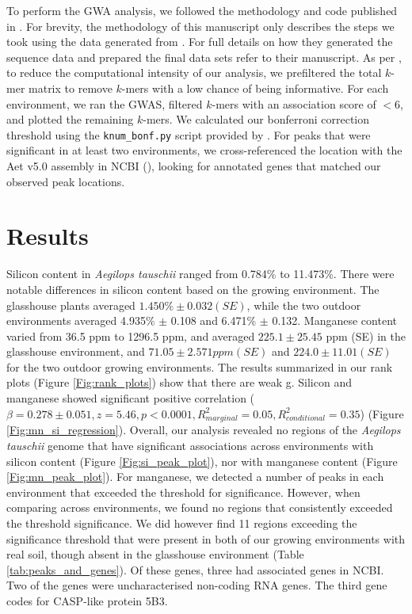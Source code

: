 \documentclass[12pt, letterpaper, ]{report}
\begin{document}
To perform the GWA analysis, we followed the methodology and code published in \textcite{gaurav_population_2022}. For brevity, the methodology of this manuscript only describes the steps we took using the data generated from \textcite{gaurav_population_2022}. For full details on how they generated the sequence data and prepared the final data sets refer to their manuscript. As per \textcite{gaurav_population_2022}, to reduce the computational intensity of our analysis, we prefiltered the total $k$-mer matrix to remove $k$-mers with a low chance of being informative. For each environment, we ran the GWAS, filtered $k$-mers with an association score of $<6$, and plotted the remaining $k$-mers. We calculated our bonferroni correction threshold using the \verb|knum_bonf.py| script provided by \textcite{gaurav_population_2022}. For peaks that were significant in at least two environments, we cross-referenced the location with the Aet v5.0 assembly in NCBI (\cite{wang_aegilops_2021}), looking for annotated genes that matched our observed peak locations. 

\section{Results}

 Silicon content in \textit{Aegilops tauschii} ranged from 0.784\% to 11.473\%. There were notable differences in silicon content based on the growing environment. The glasshouse plants averaged $1.450\% \pm 0.032 (SE)$, while the two outdoor environments averaged 4.935\% $\pm$ 0.108 and 6.471\% $\pm$ 0.132. Manganese content varied from 36.5 ppm to 1296.5 ppm, and averaged $225.1 \pm 25.45$ ppm (SE) in the glasshouse environment, and $ 71.05 \pm 2.571 ppm (SE)$ and $ 224.0 \pm 11.01 (SE)$ for the two outdoor growing environments. The results summarized in our rank plots (Figure \ref{Fig:rank_plots}) show that there are weak g. Silicon and manganese showed significant positive correlation ($\beta = 0.278 \pm 0.051, z = 5.46, p<0.0001, R^2_{marginal} = 0.05, R^2_{conditional} = 0.35 $) (Figure \ref{Fig:mn_si_regression}). Overall, our analysis revealed no regions of the \textit{Aegilops tauschii} genome that have significant associations across environments with silicon content (Figure \ref{Fig:si_peak_plot}), nor with manganese content (Figure \ref{Fig:mn_peak_plot}). For manganese, we detected a number of peaks in each environment that exceeded the threshold for significance. However, when comparing across environments, we found no regions that consistently exceeded the threshold significance. We did however find 11 regions exceeding the significance threshold that were present in both of our growing environments with real soil, though absent in the glasshouse environment (Table \ref{tab:peaks_and_genes}). Of these genes, three had associated genes in NCBI. Two of the genes were uncharacterised non-coding RNA genes. The third gene codes for CASP-like protein 5B3. 
\end{document}
